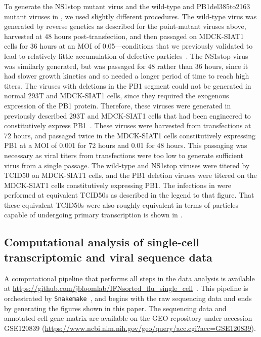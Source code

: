 \documentclass[9pt,lineno]{template}
\begin{document}
To generate the NS1stop mutant virus and the wild-type and PB1del385to2163 mutant viruses in , we used slightly different procedures.
The wild-type virus was generated by reverse genetics as described for the point-mutant viruses above, harvested at 48 hours post-transfection, and then passaged on MDCK-SIAT1 cells for 36 hours at an MOI of 0.05---conditions that we previously validated to lead to relatively little accumulation of defective particles~\citep{russell2018extreme}.
The NS1stop virus was similarly generated, but was passaged for 48 rather than 36 hours, since it had slower growth kinetics and so needed a longer period of time to reach high titers.
The viruses with deletions in the PB1 segment could not be generated in normal 293T and MDCK-SIAT1 cells, since they required the exogenous expression of the PB1 protein.
Therefore, these viruses were generated in previously described 293T and MDCK-SIAT1 cells that had been engineered to constitutively express PB1~\citep{bloom2010permissive}.
These viruses were harvested from transfections at 72 hours, and passaged twice in the MDCK-SIAT1 cells constitutively expressing PB1 at a MOI of 0.001 for 72 hours and 0.01 for 48 hours. 
This passaging was necessary as viral titers from transfections were too low to generate sufficient virus from a single passage.
The wild-type and NS1stop viruses were titered by TCID50 on MDCK-SIAT1 cells, and the PB1 deletion viruses were titered on the MDCK-SIAT1 cells constitutively expressing PB1.
The infections in  were performed at equivalent TCID50s as described in the legend to that figure.
That these equivalent TCID50s were also roughly equivalent in terms of particles capable of undergoing primary transcription is shown in .

\subsection{Computational analysis of single-cell transcriptomic and viral sequence data}
A computational pipeline that performs all steps in the data analysis is available at \url{https://github.com/jbloomlab/IFNsorted_flu_single_cell}~\citep{russell2018github}. 
This pipeline is orchestrated by \texttt{Snakemake}~\citep{koster2012snakemake}, and begins with the raw sequencing data and ends by generating the figures shown in this paper.
The sequencing data and annotated cell-gene matrix are available on the GEO repository under accession GSE120839 (\url{https://www.ncbi.nlm.nih.gov/geo/query/acc.cgi?acc=GSE120839}).
\end{document}
